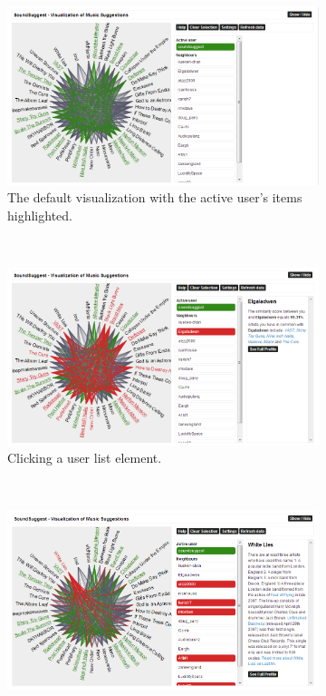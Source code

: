 \documentclass[a4paper,10pt,twocolumn]{article}
\begin{document}
\begin{appendices}
	\begin{figure}
		\centering
		\begin{subfigure}[t]{0.3\textwidth}
						\centering
						\includegraphics[width=\textwidth]{img/prototype_soundsuggest3_default}
						\caption{The default visualization with the active user's items highlighted.}
						\label{figure:prototype_soundsuggest3_default}
		\end{subfigure}%
		~
		\begin{subfigure}[t]{0.3\textwidth}
						\centering
						\includegraphics[width=\textwidth]{img/prototype_soundsuggest3_user_click}
						\caption{Clicking a user list element.}
						\label{figure:prototype_soundsuggest3_user_click}
		\end{subfigure}
		~
		\begin{subfigure}[t]{0.3\textwidth}
						\centering
						\includegraphics[width=\textwidth]{img/prototype_soundsuggest3_item_click}

\end{subfigure}
\end{figure}
\end{appendices}
\end{document}
